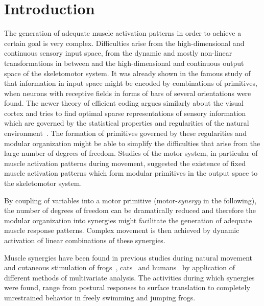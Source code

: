 \chapter{Introduction} %
\label{sg:cha:introduction}

The generation of adequate muscle activation patterns in order to achieve a certain goal is very complex. Difficulties arise from the high-dimensional and continuous sensory input space, from the dynamic and mostly non-linear transformations in between and the high-dimensional and continuous output space of the skeletomotor system. It was already shown in the famous study of \citet{Hubel:1959p3833} that information in input space might be encoded by combinations of primitives, when neurons with receptive fields in forms of bars of several orientations were found. The newer theory of efficient coding argues similarly about the visual cortex and tries to find optimal sparse representations of sensory information which are governed by the statistical properties and regularities of the natural environment~\citep{Olshausen:1996p3611}. The formation of primitives governed by these regularities and modular organization might be able to simplify the difficulties that arise from the large number of degrees of freedom. Studies of the motor system, in particular of muscle activation patterns during movement, suggested the existence of fixed muscle activation patterns which form modular primitives in the output space to the skeletomotor system. 

By coupling of variables into a motor primitive (motor-\emph{synergy} in the following), the number of degrees of freedom can be dramatically reduced and therefore the modular organization into synergies might facilitate the generation of adequate muscle response patterns. Complex movement is then achieved by dynamic activation of linear combinations of these synergies.

Muscle synergies have been found in previous studies during natural movement and cutaneous stimulation of frogs~\citep{Tresch:1999p3783,Hart:2004p3786,Davella:2003p3784,Cheung:2005p3778}, cats~\citep{Ting:2004p3785} and humans~\citep{Merkle:1998p3780,Weiss:2004p3782,Krishnamoorthy:2003p3787,Olree:1995p3781,Ivanenko:2003p3779} by application of different methods of multivariate analysis. The activities during which synergies were found, range from postural responses to surface translation to completely unrestrained behavior in freely swimming and jumping frogs.

